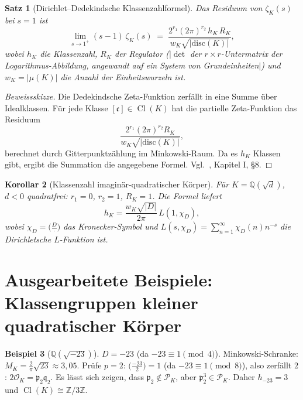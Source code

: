 \documentclass[12pt,a4paper]{amsart}
\newtheorem{theorem}{Satz}[section]
\newtheorem{corollary}[theorem]{Korollar}
\theoremstyle{definition}
\newtheorem{example}[theorem]{Beispiel}
\newcommand{\Z}{\mathbb{Z}}
\newcommand{\Q}{\mathbb{Q}}
\newcommand{\OK}{\mathcal{O}_K}
\newcommand{\p}{\mathfrak{p}}
\newcommand{\q}{\mathfrak{q}}
\newcommand{\disc}{\mathrm{disc}}
\DeclareMathOperator{\Cl}{Cl}
\begin{document}
\begin{theorem}[Dirichlet--Dedekindsche Klassenzahlformel]
\label{thm:klassenzahl}
Das Residuum von $\zeta_K(s)$ bei $s = 1$ ist
\[
  \lim_{s \to 1^+} (s-1)\,\zeta_K(s)
  \;=\;
  \frac{2^{r_1} (2\pi)^{r_2}\, h_K\, R_K}{w_K \sqrt{|\disc(K)|}},
\]
wobei $h_K$ die Klassenzahl, $R_K$ der \emph{Regulator}
($|\det$ der $r \times r$-Untermatrix der Logarithmus-Abbildung,
angewandt auf ein System von Grundeinheiten$|$)
und $w_K = |\mu(K)|$ die Anzahl der Einheitswurzeln ist.
\end{theorem}

\begin{proof}[Beweissskizze]
Die Dedekindsche Zeta-Funktion zerfällt in eine Summe über Idealklassen.
Für jede Klasse $[\mathfrak{c}] \in \Cl(K)$ hat die partielle Zeta-Funktion
das Residuum
\[
  \frac{2^{r_1}(2\pi)^{r_2} R_K}{w_K \sqrt{|\disc(K)|}},
\]
berechnet durch Gitterpunktzählung im Minkowski-Raum.
Da es $h_K$ Klassen gibt, ergibt die Summation die angegebene Formel.
Vgl.\ \cite{Neukirch1999}, Kapitel I, §8.
\end{proof}

\begin{corollary}[Klassenzahl imaginär-quadratischer Körper]
Für $K = \Q(\sqrt{d})$, $d < 0$ quadratfrei: $r_1 = 0$, $r_2 = 1$, $R_K = 1$.
Die Formel liefert
\[
  h_K = \frac{w_K \sqrt{|D|}}{2\pi}\, L(1, \chi_D),
\]
wobei $\chi_D = \bigl(\tfrac{D}{\cdot}\bigr)$ das Kronecker-Symbol und
$L(s, \chi_D) = \sum_{n=1}^\infty \chi_D(n) n^{-s}$ die Dirichletsche
$L$-Funktion ist.
\end{corollary}

\section{Ausgearbeitete Beispiele: Klassengruppen kleiner quadratischer Körper}

\begin{example}[$\Q(\sqrt{-23})$]
$D = -23$ (da $-23 \equiv 1 \pmod{4}$).  Minkowski-Schranke:
$M_K = \frac{2}{\pi}\sqrt{23} \approx 3{,}05$.
Prüfe $p = 2$: $\bigl(\tfrac{-23}{2}\bigr) = 1$ (da $-23 \equiv 1 \pmod 8$),
also zerfällt $2$: $2\OK = \p_2 \q_2$.
Es lässt sich zeigen, dass $\p_2 \notin \mathcal{P}_K$, aber
$\p_2^3 \in \mathcal{P}_K$.
Daher $h_{-23} = 3$ und $\Cl(K) \cong \Z/3\Z$.
\end{example}
\end{document}
